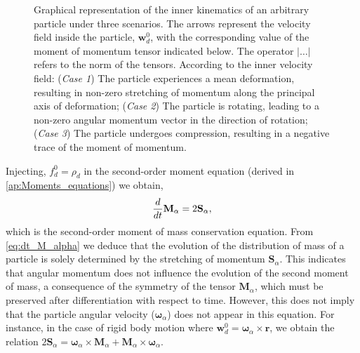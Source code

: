 \begin{figure}[h!]
    \hfill
    \caption{Graphical representation of the inner kinematics   of an arbitrary particle under three scenarios. 
        The arrows represent the velocity field inside the particle, $\textbf{w}_d^0$, with the corresponding value of the moment of momentum tensor indicated below. 
        The operator $|\ldots|$ refers to the norm of the tensors. 
        According to the inner velocity field:
        (\textit{Case 1}) The particle experiences a mean deformation, resulting in non-zero stretching of momentum along the principal axis of deformation;
        (\textit{Case 2}) The particle is rotating, leading to a non-zero angular momentum vector in the direction of rotation;
        (\textit{Case 3}) The particle undergoes compression, resulting in a negative trace of the moment of momentum.
    }
    \label{eq:scheme}
\end{figure}
Injecting, $f_d^0 = \rho_d$ in the second-order moment equation (derived in \ref{ap:Moments_equations}) we obtain,
\begin{equation}
    \ddt {\textbf{M}_\alpha}=2\textbf{S}_\alpha, 
    \label{eq:dt_M_alpha}
\end{equation}
which is the second-order moment of mass conservation equation. 
From \ref{eq:dt_M_alpha} we deduce that the evolution of the distribution of mass of a particle is solely determined by the stretching of momentum $\textbf{S}_\alpha$. 
This indicates that angular momentum does not influence the evolution of the second moment of mass, a consequence of the symmetry of the tensor $\textbf{M}_\alpha$, which must be preserved after differentiation with respect to time.
However, this does not imply that the particle angular velocity ($\bm\omega_\alpha$) does not appear in this equation. 
For instance, in the case of rigid body motion where $\textbf{w}_d^0 = \bm\omega_\alpha \times \textbf{r}$, we obtain the relation  $2\textbf{S}_\alpha = \bm\omega_\alpha \times \textbf{M}_\alpha+ \textbf{M}_\alpha\times \bm\omega_\alpha $. 

